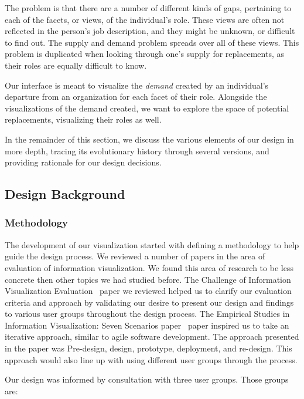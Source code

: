 \documentclass[journal]{vgtc}                %
\begin{document}
The problem is that there are a number of different kinds of gaps, pertaining to each of the facets, or views, of the individual's role. These views are often not reflected in the person's job description, and they might be unknown, or difficult to find out. The supply and demand problem spreads over all of these views. This problem is duplicated when looking through one's supply for replacements, as their roles are equally difficult to know.

Our interface is meant to visualize the \emph{demand} created by an individual's departure from an organization for each facet of their role. Alongside the visualizations of the demand created, we want to explore the space of potential replacements, visualizing their roles as well.

In the remainder of this section, we discuss the various elements of our design in more depth, tracing its evolutionary history through several versions, and providing rationale for our design decisions.

\subsection{Design Background}


\subsubsection{Methodology}
\label{sec:methodology}

The development of our visualization started with defining a methodology to help guide the design process.  We reviewed a number of papers in the area of evaluation of information visualization.  We found this area of research to be less concrete then other topics we had studied before.  The Challenge of Information Visualization Evaluation~\cite{challengeofinfoviseval} paper we reviewed helped us to clarify our evaluation criteria and approach by validating our desire to present our design and findings to various user groups throughout the design process.  The Empirical Studies in Information Visualization: Seven Scenarios paper~\cite{lam2012empirical} paper inspired us to take an iterative approach, similar to agile software development.  The approach presented in the paper was Pre-design, design, prototype, deployment, and re-design.  This approach would also line up with using different user groups through the process.

Our design was informed by consultation with three user groups. Those groups are:
\end{document}
